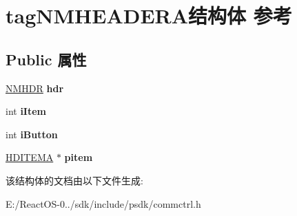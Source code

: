\hypertarget{structtag_n_m_h_e_a_d_e_r_a}{}\section{tag\+N\+M\+H\+E\+A\+D\+E\+R\+A结构体 参考}
\label{structtag_n_m_h_e_a_d_e_r_a}
\subsection*{Public 属性}
\begin{DoxyCompactItemize}
\item 
\mbox{\label{structtag_n_m_h_e_a_d_e_r_a_a8737b947cf61ade2fa453c1749220776}} 
\hyperlink{structtag_n_m_h_d_r}{N\+M\+H\+DR} {\bfseries hdr}
\item 
\mbox{\label{structtag_n_m_h_e_a_d_e_r_a_a7a050af1ae39798eea875c2b1df5481b}} 
int {\bfseries i\+Item}
\item 
\mbox{\label{structtag_n_m_h_e_a_d_e_r_a_a115be6fd86804c2e73c341a42c644065}} 
int {\bfseries i\+Button}
\item 
\mbox{\label{structtag_n_m_h_e_a_d_e_r_a_ada53c229bc4de20b56a5c60e8ffab82e}} 
\hyperlink{struct___h_d___i_t_e_m_a}{H\+D\+I\+T\+E\+MA} $\ast$ {\bfseries pitem}
\end{DoxyCompactItemize}


该结构体的文档由以下文件生成\+:\begin{DoxyCompactItemize}
\item 
E\+:/\+React\+O\+S-\/0../sdk/include/psdk/commctrl.\+h\end{DoxyCompactItemize}
